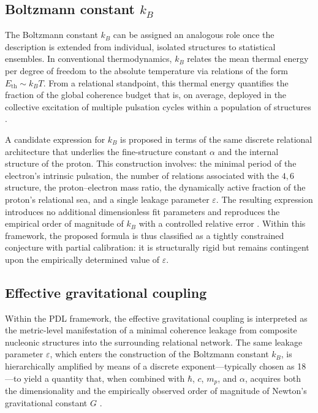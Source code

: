 \documentclass{article}
\begin{document}
\subsection{Boltzmann constant \texorpdfstring{\(k_B\)}{kB}}
\label{subsec:kB}

The Boltzmann constant \(k_B\) can be assigned an analogous role once the description is extended from individual, isolated structures to statistical ensembles. In conventional thermodynamics, \(k_B\) relates the mean thermal energy per degree of freedom to the absolute temperature via relations of the form \(E_{\mathrm{th}} \sim k_B T\). From a relational standpoint, this thermal energy quantifies the fraction of the global coherence budget that is, on average, deployed in the collective excitation of multiple pulsation cycles within a population of structures
\citep{PDL_Main_2026,PDL_position}.

A candidate expression for \(k_B\) is proposed in terms of the same discrete relational architecture that underlies the fine-structure constant \(\alpha\) and the internal structure of the proton. This construction involves: the minimal period of the electron’s intrinsic pulsation, the number of relations associated with the \(4,6\) structure, the proton–electron mass ratio, the dynamically active fraction of the proton’s relational sea, and a single leakage parameter \(\varepsilon\). The resulting expression introduces no additional dimensionless fit parameters and reproduces the empirical order of magnitude of \(k_B\) with a controlled relative error
\citep{PDL_Main_2026,Coherence_Leakage_18_2026}. Within this framework, the proposed formula is thus classified as a tightly constrained conjecture with partial calibration: it is structurally rigid but remains contingent upon the empirically determined value of \(\varepsilon\).

\subsection{Effective gravitational coupling}
\label{subsec:gravity_constant}

Within the PDL framework, the effective gravitational coupling is interpreted as the metric-level manifestation of a minimal coherence leakage from composite nucleonic structures into the surrounding relational network. The same leakage parameter \(\varepsilon\), which enters the construction of the Boltzmann constant \(k_B\), is hierarchically amplified by means of a discrete exponent—typically chosen as 18—to yield a quantity that, when combined with \(\hbar\), \(c\), \(m_p\), and \(\alpha\), acquires both the dimensionality and the empirically observed order of magnitude of Newton’s gravitational constant \(G\)
\citep{PDL_Main_2026,Exponent_18_PDL_2026,PDL_position}.
\end{document}
